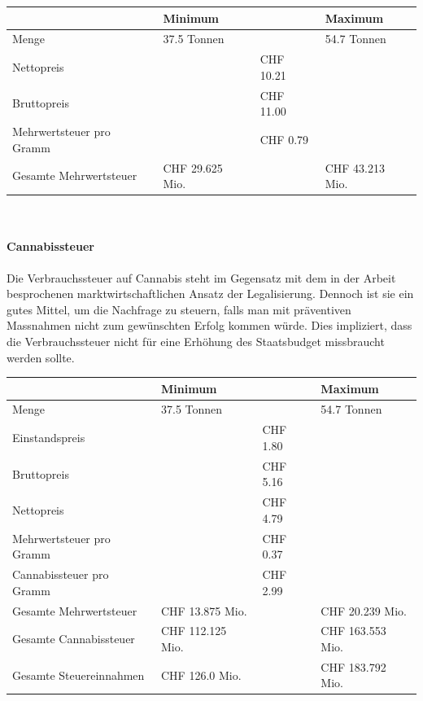 \documentclass[../main.tex]{subfiles}
\begin{document}
     \noindent
	 \captionsetup{font=small}
	 \label{table:mwst-illegal}
	 \begin{tabularx}{\textwidth}{X p{3.5cm} p{2.5cm} p{3.5cm}}
     	\toprule
     	\phantom{x} & Minimum & & Maximum \\
        \midrule
        Menge & 37.5 Tonnen & & 54.7 Tonnen \\
        \midrule
        Nettopreis & & CHF 10.21 & \\
        \midrule
        Bruttopreis & & CHF 11.00 & \\
        \midrule
        Mehrwertsteuer pro Gramm & & CHF 0.79 & \\
        \midrule
        Gesamte Mehrwertsteuer & CHF 29.625 Mio. & & CHF 43.213 Mio.\\
        \bottomrule
     \end{tabularx}\\
	 
	 
	 
	 
	 \paragraph{Cannabissteuer}
	 Die Verbrauchssteuer auf Cannabis steht im Gegensatz mit dem in der Arbeit besprochenen marktwirtschaftlichen Ansatz der Legalisierung.
	 Dennoch ist sie ein gutes Mittel, um die Nachfrage zu steuern, falls man mit präventiven Massnahmen nicht zum gewünschten Erfolg kommen würde.
	 Dies impliziert, dass die Verbrauchssteuer nicht für eine Erhöhung des Staatsbudget missbraucht werden sollte.	 
	 
	 \noindent
	 \captionsetup{font=small}
	 \label{table:cannabissteuer}
	 \begin{tabularx}{\textwidth}{X p{3.5cm} p{2.5cm} p{3.5cm}}
     	\toprule
     	\phantom{x} & Minimum & & Maximum \\
        \midrule
        Menge & 37.5 Tonnen & & 54.7 Tonnen \\
        \midrule
        Einstandspreis & & CHF 1.80 & \\
        \midrule
        Bruttopreis & & CHF 5.16 & \\
        \midrule
        Nettopreis & & CHF 4.79 & \\
        \midrule
        Mehrwertsteuer pro Gramm & & CHF 0.37 & \\
        \midrule
        Cannabissteuer pro Gramm & & CHF 2.99 & \\
        \midrule
        Gesamte Mehrwertsteuer & CHF 13.875 Mio. & & CHF 20.239 Mio.\\
        \midrule
        Gesamte Cannabissteuer & CHF 112.125 Mio. & & CHF 163.553 Mio.\\
        \midrule
        Gesamte Steuereinnahmen & CHF 126.0 Mio. & & CHF 183.792 Mio.\\
        \bottomrule
     \end{tabularx}\\ \\ \\
     
\end{document}
